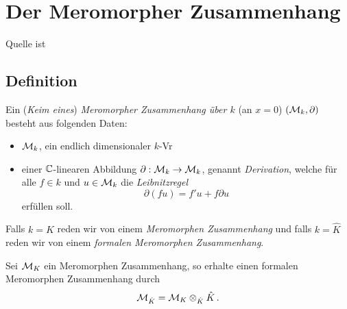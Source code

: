 
\chapter{Der Meromorpher Zusammenhang}
Quelle ist \cite{sabbah_cimpa90}
\section{Definition}

\begin{defn}
  Ein (\emph{Keim eines}) \emph{Meromorpher Zusammenhang über $k$} (an $x=0$)
  $(\mathcal{M}_k,\partial)$ besteht aus folgenden Daten:
  \begin{itemize}
    \item $\mathcal{M}_k$, ein endlich dimensionaler $k$-Vr
    \item einer $\mathbb{C}$-linearen Abbildung $\partial:\mathcal{M}_k\rightarrow \mathcal{M}_k$,
      genannt \emph{Derivation}, welche für alle $f\in k$ und $u\in \mathcal{M}_k$ die
      \emph{Leibnitzregel}
      \begin{equation}\label{eq:Leibnitzregel}
        \partial(fu)=f'u+f\partial u
      \end{equation}
      erfüllen soll.
  \end{itemize}
  Falls $k=K$ reden wir von einem \emph{Meromorphen Zusammenhang}
  und falls $k=\hat K$ reden wir von einem \emph{formalen Meromorphen
  Zusammenhang}.
\end{defn}
\begin{bem}
  Sei $\mathcal{M}_K$ ein Meromorphen Zusammenhang, so erhalte einen formalen
  Meromorphen Zusammenhang durch
  \[ \mathcal{M}_{\hat K} = \mathcal{M}_K\otimes_{\hat K}\hat K \,. \]
\end{bem}

